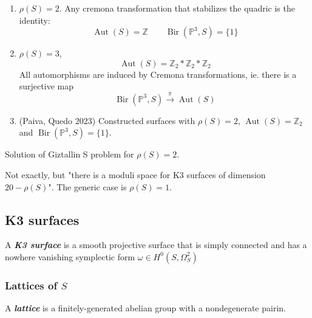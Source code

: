 \begin{example}[Oguiso, 2012]\leavevmode 
	\begin{enumerate}
		\item $\rho(S)=2$. Any cremona transformation that stabilizes the quadric is the identity:
			\[\operatorname{Aut}(S)=\mathbb{Z}\qquad \operatorname{Bir}(\mathbb{P}^3,S)=\{1\}\]
	
			
		\item $\rho(S)=3$,
			\[\operatorname{Aut}(S)=\mathbb{Z}_2*\mathbb{Z}_2*\mathbb{Z}_2\]
			All automorphisms are induced by Cremona transformations, ie. there is a surjective map
			\[\operatorname{Bir}(\mathbb{P}^3,S)\overset{\pi}{\longrightarrow}\operatorname{Aut}(S)\]

		\item (Paiva, Quedo 2023) Constructed surfaces with $\rho(S)=2$, $\operatorname{Aut}(S)=\mathbb{Z}_2$ and $\operatorname{Bir}(\mathbb{P}^3,S)=\{1\}$.
	\end{enumerate}
\end{example}

\begin{thm}\leavevmode
	Solution of Giztallin S problem for $\rho(S)=2$.
\end{thm}

\begin{remark}
	Not exactly, but "there is a moduli space for K3 surfaces of dimension $20-\rho(S)$". The generic case is $\rho(S)=1$.
\end{remark}

\subsection{K3 surfaces}

\begin{defn}
	A \textit{\textbf{K3 surface}} is a smooth projective surface that is simply connected and has a nowhere vanishing symplectic form $\omega\in H^{0}(S,\Omega^2_S)$
\end{defn}

\subsubsection{Lattices of $S$}

A \textit{\textbf{lattice}} is a finitely-generated abelian group with a nondegenerate pairin.

